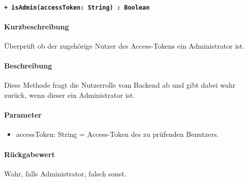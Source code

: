 \paragraph{\texttt{+ isAdmin(accessToken: String) : Boolean}}\label{AP_Framework_isAdmin}%
\paragraph*{Kurzbeschreibung}
Überprüft ob der zugehörige Nutzer des Access-Tokens ein Administrator ist.
\paragraph*{Beschreibung}
Diese Methode fragt die Nutzerrolle vom Backend ab und gibt dabei wahr zurück, wenn dieser ein Administrator ist.
\paragraph*{Parameter}
\begin{itemize}
    \item accessToken: String = Access-Token des zu prüfenden Benutzers.
\end{itemize}
\paragraph*{Rückgabewert}
Wahr, falls Administrator, falsch sonst.